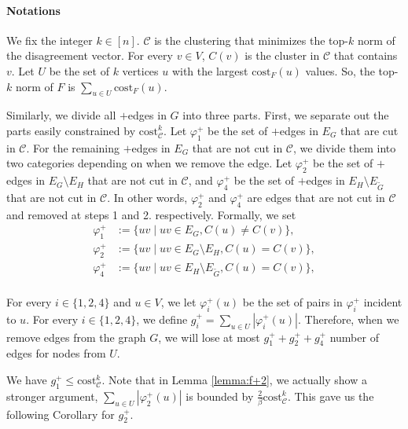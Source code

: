 \documentclass[11pt]{article}
\newcommand{\cost}{\mathrm{cost}}
\newcommand{\calC}{{\mathcal{C}}}
\begin{document}
\begin{CJK*}{UTF8}{gbsn}
\paragraph{Notations} 
We fix the integer $k \in [n]$. $\mathcal{C}$ is the clustering that minimizes the top-$k$ norm of the disagreement vector.  For every $v \in V$, $C(v)$ is the cluster in $\calC$ that contains $v$. Let $U$ be the set of $k$ vertices $u$ with the largest $\cost_F(u)$ values. So, the top-$k$ norm of $F$ is $\sum_{u \in U}\cost_F(u)$.




 Similarly, we divide all $+$edges in $G$ into three parts. First, we separate out the parts easily constrained by $\cost^k_\calC$. Let $\varphi^+_1$ be the set of $+$edges in $E_G$ that are cut in $\calC$. For the remaining $+$edges in $E_G$ that are not cut in $\calC$, we divide them into two categories depending on when we remove the edge. Let $\varphi^+_2$ be the set of $+$edges in $E_G\setminus E_H$ that are not cut in $\calC$, and $\varphi^+_4$ be the set of $+$edges in $E_H\setminus E_{\tilde{G}}$ that are not cut in $\calC$. In other words,  $\varphi^+_2$ and $\varphi^+_4$ are edges that are not cut in $\calC$ and removed at steps 1 and 2. respectively. Formally, we set 
\begin{align*}
    \varphi^+_1 &:= \{uv \mid uv \in E_G, C(u) \not= C(v) \},\\
    \varphi^+_2 &:= \{uv \mid uv \in E_G \setminus E_H, C(u) = C(v) \},   \\
    \varphi^+_4 &:= \{uv \mid uv \in E_H \setminus E_{\tilde{G}}, C(u) = C(v) \}, \\
\end{align*} 

For every $i \in \{1, 2, 4\}$ and $u \in V$, we let $\varphi^+_i(u)$ be the set of pairs in $\varphi^+_i$ incident to $u$. 
For every $i \in \{1, 2, 4\}$,  we define $g^+_i = \sum_{u \in U}|\varphi^+_i(u)|$. Therefore, when we remove edges from the graph $G$, we will lose at most $ g^+_1 + g^+_2 + g^+_4$ number of edges for nodes from $U$. 

We have $g^+_1 \leq \cost^k_{\mathcal{C}}$. Note that in Lemma \ref{lemma:f+2}, we actually show a stronger argument, $\sum_{u \in U}|\varphi^+_2(u)|$ is bounded by $\frac{2}{\beta}\cost^k_{\mathcal{C}}$. This gave us the following Corollary for $g^+_2$. 


\end{CJK*}
\end{document}
